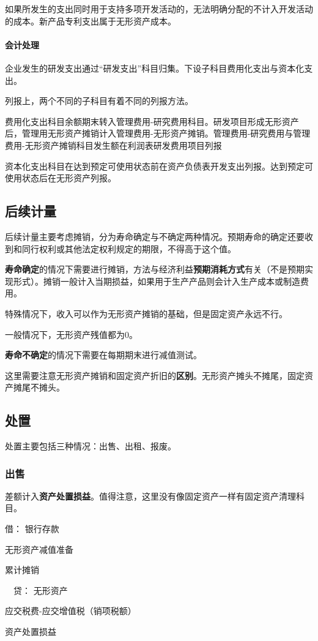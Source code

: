 \documentclass[UTF8,12pt]{ctexart}
\newenvironment{Dr}{\noindent 借：}{\par}
\newenvironment{Cr}{\noindent \ \ 贷：}{\par}
\numberwithin{equation}{section} %
\numberwithin{figure}{section}
\numberwithin{table}{section}
\begin{document}
	如果所发生的支出同时用于支持多项开发活动的，无法明确分配的不计入开发活动的成本。新产品专利支出属于无形资产成本。
	
	\paragraph{会计处理}
	企业发生的研发支出通过“研发支出”科目归集。下设子科目费用化支出与资本化支出。
	
	列报上，两个不同的子科目有着不同的列报方法。
	
	费用化支出科目余额期末转入管理费用-研究费用科目。研发项目形成无形资产后，管理用无形资产摊销计入管理费用-无形资产摊销。管理费用-研究费用与管理费用-无形资产摊销科目发生额在利润表研发费用项目列报
	
	资本化支出科目在达到预定可使用状态前在资产负债表开发支出列报。达到预定可使用状态后在无形资产列报。
	
	
	
	\subsection{后续计量}
	后续计量主要考虑摊销，分为寿命确定与不确定两种情况。预期寿命的确定还要收到和同行权利或其他法定权利规定的期限，不得高于这个值。
	
	\textbf{寿命确定}的情况下需要进行摊销，方法与经济利益\textbf{预期消耗方式}有关（不是预期实现形式）。摊销一般计入当期损益，如果用于生产产品则会计入生产成本或制造费用。
	
	特殊情况下，收入可以作为无形资产摊销的基础，但是固定资产永远不行。
	
	一般情况下，无形资产残值都为0。
	
	\textbf{寿命不确定}的情况下需要在每期期末进行减值测试。
	
	这里需要注意无形资产摊销和固定资产折旧的\textbf{区别}。无形资产摊头不摊尾，固定资产摊尾不摊头。
	
	\subsection{处置}
	
	处置主要包括三种情况：出售、出租、报废。
	
	\subsubsection{出售}
	差额计入\textbf{资产处置损益}。值得注意，这里没有像固定资产一样有固定资产清理科目。
	
	\begin{Dr}
		银行存款
		
		无形资产减值准备
		
		累计摊销
	\end{Dr}
	\begin{Cr}
		无形资产
		
		应交税费-应交增值税（销项税额）
		
		资产处置损益
	\end{Cr}
	
\end{document}
